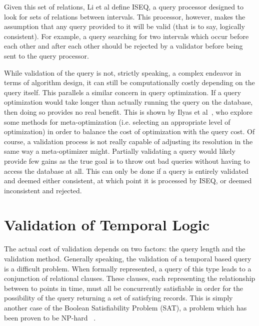 \documentclass{achemso}
\begin{document}
Given this set of relations, Li et al define ISEQ, a query processor designed to look for sets of relations between intervals. This processor, however, makes the assumption that any query provided to it will be valid (that is to say, logically consistent). For example, a query searching for two intervals which occur before each other and after each other should be rejected by a validator before being sent to the query processor.

While validation of the query is not, strictly speaking, a complex endeavor in terms of algorithm design, it can still be computationally costly depending on the query itself. This parallels a similar concern in query optimization. If a query optimization would take longer than actually running the query on the database, then doing so provides no real benefit. This is shown by Ilyas et al~\cite{Ilyas:2003}, who explore some methods for meta-optimization (i.e. selecting an appropriate level of optimization) in order to balance the cost of optimization with the query cost.
Of course, a validation process is not really capable of adjusting its resolution in the same way a meta-optimizer might. Partially validating a query would likely provide few gains as the true goal is to throw out bad queries without having to access the database at all. This can only be done if a query is entirely validated and deemed either consistent, at which point it is processed by ISEQ, or deemed inconsistent and rejected.

\section{Validation of Temporal Logic}
The actual cost of validation depends on two factors: the query length and the validation method.  Generally speaking, the validation of a temporal based query is a difficult problem.  When formally represented, a query of this type leads to a conjunction of relational clauses.  These clauses, each representing the relationship between to points in time, must all be concurrently satisfiable in order for the possibility of the query returning a set of satisfying records.  This is simply another case of the Boolean Satisfiability Problem (SAT), a problem which has been proven to be NP-hard ~\cite{Cook:1971}.
\end{document}
